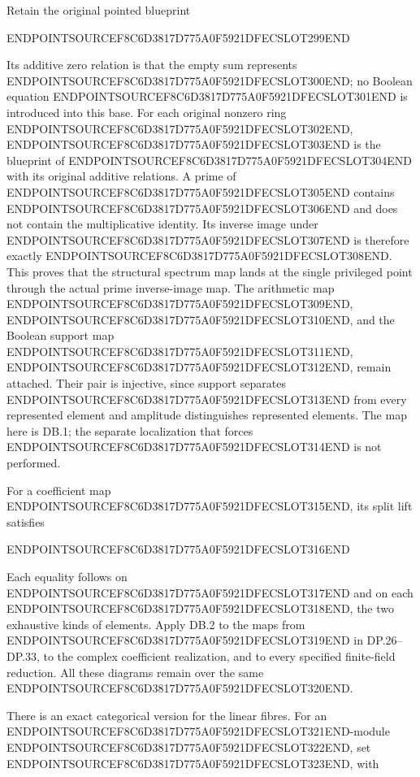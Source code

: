 Retain the original pointed blueprint

ENDPOINTSOURCEF8C6D3817D775A0F5921DFECSLOT299END

Its additive zero relation is that the empty sum represents ENDPOINTSOURCEF8C6D3817D775A0F5921DFECSLOT300END; no Boolean equation ENDPOINTSOURCEF8C6D3817D775A0F5921DFECSLOT301END is introduced into this base. For each original nonzero ring ENDPOINTSOURCEF8C6D3817D775A0F5921DFECSLOT302END, ENDPOINTSOURCEF8C6D3817D775A0F5921DFECSLOT303END is the blueprint of ENDPOINTSOURCEF8C6D3817D775A0F5921DFECSLOT304END with its original additive relations. A prime of ENDPOINTSOURCEF8C6D3817D775A0F5921DFECSLOT305END contains ENDPOINTSOURCEF8C6D3817D775A0F5921DFECSLOT306END and does not contain the multiplicative identity. Its inverse image under ENDPOINTSOURCEF8C6D3817D775A0F5921DFECSLOT307END is therefore exactly ENDPOINTSOURCEF8C6D3817D775A0F5921DFECSLOT308END. This proves that the structural spectrum map lands at the single privileged point through the actual prime inverse-image map. The arithmetic map ENDPOINTSOURCEF8C6D3817D775A0F5921DFECSLOT309END, ENDPOINTSOURCEF8C6D3817D775A0F5921DFECSLOT310END, and the Boolean support map ENDPOINTSOURCEF8C6D3817D775A0F5921DFECSLOT311END, ENDPOINTSOURCEF8C6D3817D775A0F5921DFECSLOT312END, remain attached. Their pair is injective, since support separates ENDPOINTSOURCEF8C6D3817D775A0F5921DFECSLOT313END from every represented element and amplitude distinguishes represented elements. The map here is DB.1; the separate localization that forces ENDPOINTSOURCEF8C6D3817D775A0F5921DFECSLOT314END is not performed.

For a coefficient map ENDPOINTSOURCEF8C6D3817D775A0F5921DFECSLOT315END, its split lift satisfies

ENDPOINTSOURCEF8C6D3817D775A0F5921DFECSLOT316END

Each equality follows on ENDPOINTSOURCEF8C6D3817D775A0F5921DFECSLOT317END and on each ENDPOINTSOURCEF8C6D3817D775A0F5921DFECSLOT318END, the two exhaustive kinds of elements. Apply DB.2 to the maps from ENDPOINTSOURCEF8C6D3817D775A0F5921DFECSLOT319END in DP.26--DP.33, to the complex coefficient realization, and to every specified finite-field reduction. All these diagrams remain over the same ENDPOINTSOURCEF8C6D3817D775A0F5921DFECSLOT320END.

There is an exact categorical version for the linear fibres. For an ENDPOINTSOURCEF8C6D3817D775A0F5921DFECSLOT321END-module ENDPOINTSOURCEF8C6D3817D775A0F5921DFECSLOT322END, set ENDPOINTSOURCEF8C6D3817D775A0F5921DFECSLOT323END, with

